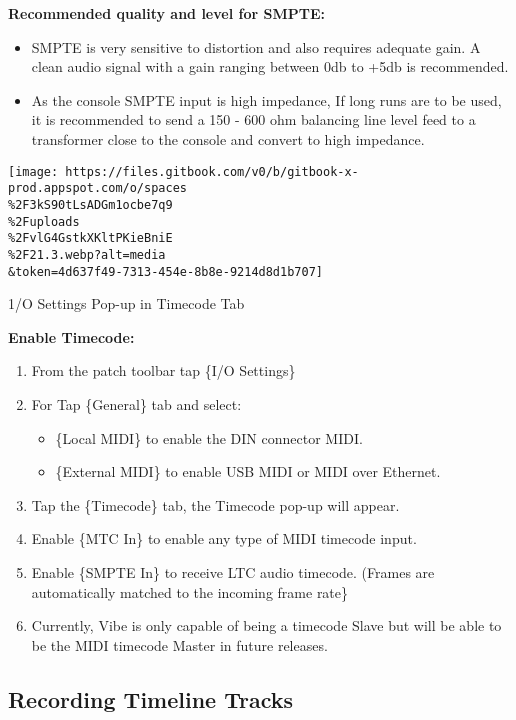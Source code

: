 \documentclass[
]{article}
\begin{document}
\textbf{Recommended quality and level for SMPTE:}

\begin{itemize}
\item
  SMPTE is very sensitive to distortion and also requires adequate gain. A clean audio signal with a gain ranging between 0db to +5db is recommended.
\item
  As the console SMPTE input is high impedance, If long runs are to be used, it is recommended to send a 150 - 600 ohm balancing line level feed to a transformer close to the console and convert to high impedance.
\end{itemize}

\texttt{[image: https://files.gitbook.com/v0/b/gitbook-x-prod.appspot.com/o/spaces\\\%2F3kS90tLsADGm1ocbe7q9\\\%2Fuploads\\\%2FvlG4GstkXKltPKieBniE\\\%2F21.3.webp?alt=media\\\&token=4d637f49-7313-454e-8b8e-9214d8d1b707]}

1/O Settings Pop-up in Timecode Tab

\textbf{Enable Timecode:}

\begin{enumerate}
\def\labelenumi{\arabic{enumi}.}
\item
  From the patch toolbar tap \{I/O Settings\}
\item
  For Tap \{General\} tab and select:

  \begin{itemize}
  \item
    \{Local MIDI\} to enable the DIN connector MIDI.
  \item
    \{External MIDI\} to enable USB MIDI or MIDI over Ethernet.
  \end{itemize}
\item
  Tap the \{Timecode\} tab, the Timecode pop-up will appear.
\item
  Enable \{MTC In\} to enable any type of MIDI timecode input.
\item
  Enable \{SMPTE In\} to receive LTC audio timecode. (Frames are automatically matched to the incoming frame rate\}
\item
  {Currently, Vibe is only capable of being a timecode Slave but will be able to be the MIDI timecode Master in future releases.}
\end{enumerate}

\hypertarget{recording-timeline-tracks}{%
\subsection{Recording Timeline Tracks}\label{recording-timeline-tracks}}
\end{document}
